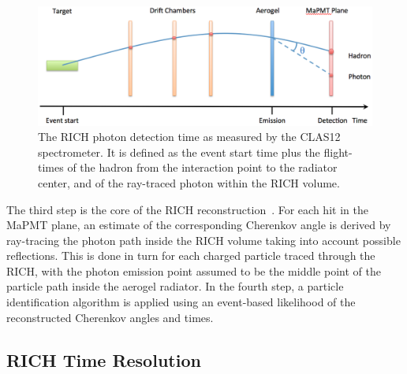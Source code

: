 \documentclass[5p,times,twocolumn]{elsarticle}
\begin{document}
\begin{figure}[t]
\begin{center}
\includegraphics[width=1.0\columnwidth]{Tracking_time.png}
\end{center}
\caption{The RICH photon detection time as measured by the  CLAS12 spectrometer. It is defined as the event start
  time plus the flight-times of the hadron from the interaction point to the radiator center, and of the ray-traced
  photon within the RICH volume.}
\label{Fig:Traced_Time}
\end{figure}

The third step is the core of the RICH reconstruction~\cite{recon-nim}. For each hit in the MaPMT plane, an
estimate of the corresponding Cherenkov angle is derived by ray-tracing the photon path inside the RICH volume
taking into account possible reflections. This is done in turn for each charged particle traced through the RICH, with
the photon emission point assumed to be the middle point of the particle path inside the aerogel radiator. In the fourth
step, a particle identification algorithm is applied using an event-based likelihood of the reconstructed Cherenkov
angles and times.

\subsection{RICH Time Resolution}
\label{sec:TimeCalib}
\end{document}
